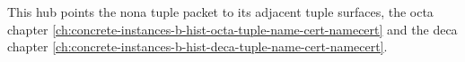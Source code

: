 This hub points the nona tuple packet to its adjacent tuple surfaces, the octa chapter \autoref{ch:concrete-instances-b-hist-octa-tuple-name-cert-namecert} and the deca chapter \autoref{ch:concrete-instances-b-hist-deca-tuple-name-cert-namecert}.


